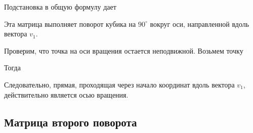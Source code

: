 \documentclass[a4paper,14pt]{extarticle}
\begin{document}
Подстановка в общую формулу дает

\begin{center}\end{center}

Эта матрица выполняет поворот кубика на $90^\circ$ вокруг оси, направленной вдоль вектора $v_1$.

Проверим, что точка на оси вращения остается неподвижной. Возьмем точку

\begin{center}\end{center}

Тогда

\begin{center}\end{center}

Следовательно, прямая, проходящая через начало координат вдоль вектора $v_1$, действительно является осью вращения.

\subsection*{Матрица второго поворота}
\end{document}
